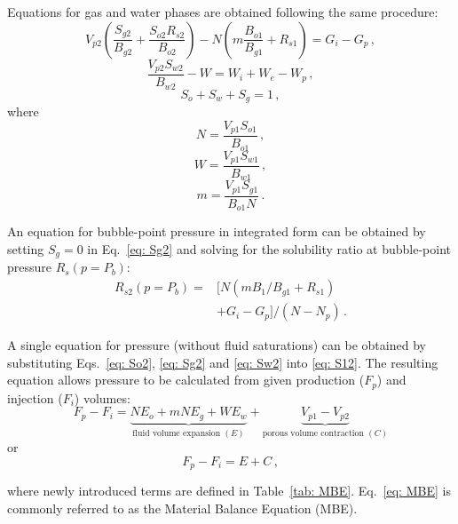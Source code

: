 \documentclass[authoryear,preprint,review,12pt]{elsarticle}
\begin{document}
Equations for gas and water phases are obtained following the same procedure:
\begin{equation}\label{eq: Sg5}
V_{p2}\left(\frac{S_{g2}}{B_{g2}} +\frac{S_{o2} R_{s2}}{B_{o2}}\right) - N\left(m\frac{B_{o1}}{B_{g1}} + R_{s1}\right)=G_i-G_p \, ,
\end{equation}
\begin{equation}\label{eq: Sw5}
\frac{V_{p2} S_{w2}}{B_{w2}} - W=W_i+W_e-W_p \, ,
\end{equation}
%
\begin{equation}\label{eq: S15}
S_o+S_w+S_g=1 \, ,
\end{equation}
where
\begin{equation}
N=\frac{V_{p1} S_{o1}}{B_{o1}} \, ,
\end{equation}
\begin{equation}
W=\frac{V_{p1} S_{w1}}{B_{w1}} \, ,
\end{equation}
\begin{equation}
m=\frac{V_{p1} S_{g1}}{B_{o1} N} \, .
\end{equation}

An equation for bubble-point pressure in integrated form can be obtained by setting $S_g=0$ in Eq.~\eqref{eq: Sg2} and solving for the solubility ratio at bubble-point pressure $R_s(p=P_b)$:
\begin{equation}
\begin{split}
R_{s2}\left(p=P_b\right) = &\Big[N\left(m B_{1}/B_{g1} +R_{s1}\right)\\
&+G_i-G_p\Big]/\left(N-N_p\right) \, .
\end{split}
\end{equation}

A single equation for pressure (without fluid saturations) can be obtained by substituting Eqs.~\eqref{eq: So2}, \eqref{eq: Sg2} and \eqref{eq: Sw2} into \eqref{eq: S12}. The resulting equation allows pressure to be calculated from given production ($F_p$) and injection ($F_i$) volumes:
\begin{equation}\label{eq: MBE}
F_p - F_i= \underbrace{N E_o + mN E_g + W E_w}_{\text{fluid volume expansion } (E)} +\underbrace{V_{p1}-V_{p2}}_{\text{porous volume contraction } (C)}
\end{equation}
or
\begin{equation}\label{eq: MBE_short}
F_p - F_i= E + C \, ,
\end{equation}

where newly introduced terms are defined in Table~\ref{tab: MBE}. Eq.~\eqref{eq: MBE} is commonly referred to as the Material Balance Equation (MBE).
\end{document}
